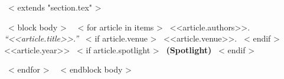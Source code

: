 ~< extends "section.tex" >~

~< block body >~
  ~< for article in items >~
    <<article.authors>>. {\it``<<article.title>>.''}
    ~< if article.venue >~
      <<article.venue>>.
    ~< endif >~
    <<article.year>>
    ~< if article.spotlight >~
      {\bf {\color{red}(Spotlight)}}
    ~< endif >~

  ~< endfor >~
~< endblock body >~